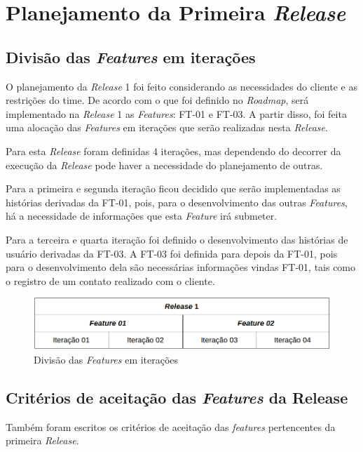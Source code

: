 \pagebreak

\section{Planejamento da Primeira \textit{Release}}

\subsection{Divisão das \textit{Features} em iterações}
O planejamento da \textit{Release} 1 foi feito considerando as necessidades do cliente e as restrições do time.
De acordo com o que foi definido no \textit{Roadmap}, será implementado na \textit{Release} 1 as \textit{Features}: FT-01 e FT-03. A partir disso, foi feita uma alocação das \textit{Features} em iterações que serão realizadas nesta \textit{Release}.

Para esta \textit{Release} foram definidas 4 iterações, mas dependendo do decorrer da execução da \textit{Release} pode haver a necessidade do planejamento de outras. 

Para a primeira e segunda iteração ficou decidido que serão implementadas as histórias derivadas da FT-01, pois, para o desenvolvimento das outras \textit{Features}, há a necessidade de informações que esta \textit{Feature} irá submeter.

Para a terceira e quarta iteração foi definido o desenvolvimento das histórias de usuário derivadas da FT-03. A FT-03 foi definida para depois da  FT-01, pois para o desenvolvimento dela são necessárias informações vindas FT-01, tais como o registro de um contato realizado com o cliente.

\begin{figure}[!htb]
\includegraphics[scale=0.5]{figuras/planejamento_release.png}
\caption{Divisão das \textit{Features} em iterações}
\label{fig:backlog}
\end{figure}

\subsection{Critérios de aceitação das \textit{Features} da Release}
Também foram escritos os critérios de aceitação das \textit{features} pertencentes da primeira \textit{Release}.

